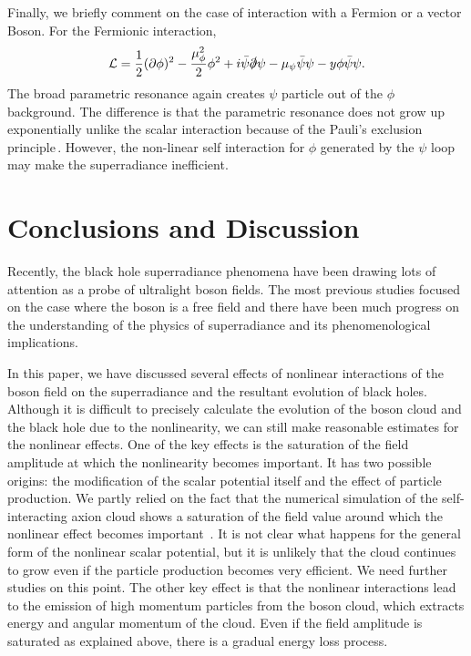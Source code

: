 \documentclass[%
 preprint,
 nofootinbib,
 amsmath,amssymb,
 aps,
 a4paper
]{revtex4-1}
\begin{document}
Finally, we briefly comment on the case of interaction with a Fermion or a vector Boson. For the Fermionic interaction,
\begin{align}
\mathcal{L} = \frac{1}{2}(\partial\phi)^2 -\frac{\mu_\phi^2}{2}\phi^2 + i\bar{\psi}\slashed{\partial}\psi - \mu_\psi \bar{\psi}\psi - y\phi\bar{\psi}\psi.
\end{align}
The broad parametric resonance again creates $\psi$ particle out of the $\phi$ background. The difference is that the parametric resonance does not grow up exponentially unlike the scalar interaction because of the Pauli's exclusion principle\,\cite{Greene:1998nh,Greene:2000ew,Peloso:2000hy}.
However, the non-linear self interaction for $\phi$ generated by the $\psi$ loop may make the superradiance inefficient.


\section{Conclusions and Discussion} \label{sec:dis}



Recently, the black hole superradiance phenomena have been drawing lots of attention as a probe of ultralight boson fields. The most previous studies focused on the case where the boson is a free field and there have been much progress on the understanding of the physics of superradiance and its phenomenological implications.

In this paper, we have discussed several effects of nonlinear interactions of the boson field on the superradiance and the resultant evolution of black holes. Although it is difficult to precisely calculate the evolution of the boson cloud and the black hole due to the nonlinearity, we can still make reasonable estimates for the nonlinear effects.
One of the key effects is the saturation of the field amplitude at which the nonlinearity becomes important. It has two possible origins: the modification of the scalar potential itself and the effect of particle production.
We partly relied on the fact that the numerical simulation of the self-interacting axion cloud shows a saturation of the field value around which the nonlinear effect becomes important~\cite{Yoshino:2012kn,Yoshino:2019}. It is not clear what happens for the general form of the nonlinear scalar potential, but it is unlikely that the cloud continues to grow even if the particle production becomes very efficient. We need further studies on this point.
The other key effect is that the nonlinear interactions lead to the emission of high momentum particles from the boson cloud, which extracts energy and angular momentum of the cloud. Even if the field amplitude is saturated as explained above, there is a gradual energy loss process.
\end{document}

